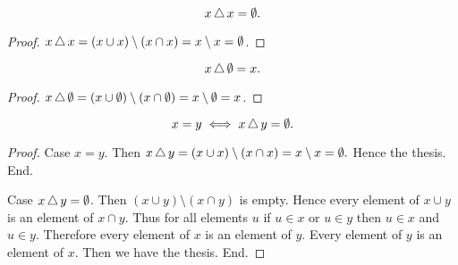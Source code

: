 \documentclass[../../set-theory.ftl.tex]{subfiles}
\begin{document}
\begin{forthel}
    \begin{proposition}\label{SetTheory_01_04_496712}
      \[ x \mathop{\triangle} x = \emptyset. \]
    \end{proposition}
    \begin{proof}
      $x \mathop{\triangle} x
      = (x \cup x) \setminus (x \cap x)
      = x \setminus x
      = \emptyset$.
    \end{proof}

    \begin{proposition}\label{SetTheory_01_04_182395}
      \[ x \mathop{\triangle} \emptyset = x. \]
    \end{proposition}
    \begin{proof}
      $x \mathop{\triangle} \emptyset
      = (x \cup \emptyset) \setminus (x \cap \emptyset)
      = x \setminus \emptyset = x$.
    \end{proof}

    \begin{proposition}\label{SetTheory_01_04_814558}
      \[ x = y \iff x \mathop{\triangle} y = \emptyset. \]
    \end{proposition}
    \begin{proof}
      Case $x = y$.
        Then $x \mathop{\triangle} y = (x \cup x) \setminus (x \cap x) = x \setminus x =
        \emptyset.$
        Hence the thesis.
      End.

      Case $x \mathop{\triangle} y = \emptyset$.
        Then $(x \cup y) \setminus (x \cap y)$ is empty.
        Hence every element of $x \cup y$ is an element of $x \cap y$.
        Thus for all elements $u$ if $u \in x$ or $u \in y$ then $u \in x$ and
        $u \in y$.
        Therefore every element of $x$ is an element of $y$.
        Every element of $y$ is an element of $x$.
        Then we have the thesis.
      End.
    \end{proof}
  \end{forthel}
\end{document}
